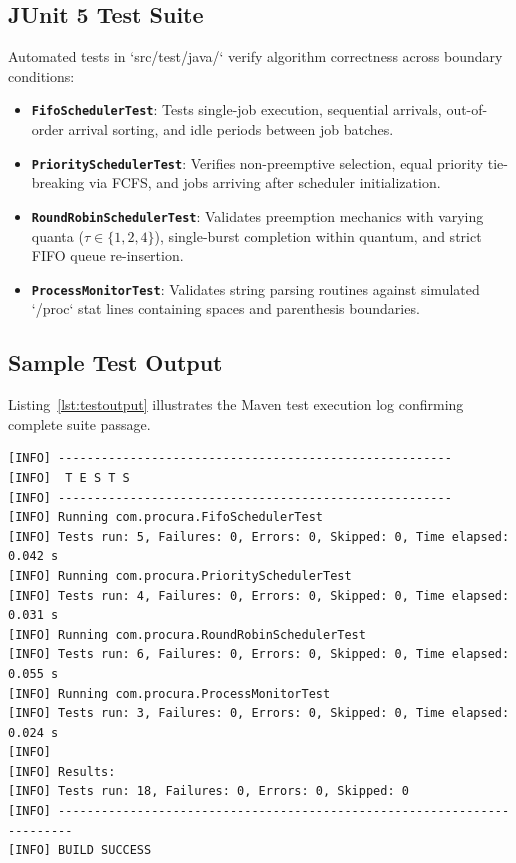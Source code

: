\documentclass[12pt,a4paper]{article}
\begin{document}
\subsection{JUnit 5 Test Suite}
Automated tests in `src/test/java/` verify algorithm correctness across boundary conditions:
\begin{itemize}
    \item \textbf{\texttt{FifoSchedulerTest}}: Tests single-job execution, sequential arrivals, out-of-order arrival sorting, and idle periods between job batches.
    \item \textbf{\texttt{PrioritySchedulerTest}}: Verifies non-preemptive selection, equal priority tie-breaking via FCFS, and jobs arriving after scheduler initialization.
    \item \textbf{\texttt{RoundRobinSchedulerTest}}: Validates preemption mechanics with varying quanta ($\tau \in \{1, 2, 4\}$), single-burst completion within quantum, and strict FIFO queue re-insertion.
    \item \textbf{\texttt{ProcessMonitorTest}}: Validates string parsing routines against simulated `/proc` stat lines containing spaces and parenthesis boundaries.
\end{itemize}

\subsection{Sample Test Output}
Listing~\ref{lst:testoutput} illustrates the Maven test execution log confirming complete suite passage.

\begin{lstlisting}[caption={Maven Surefire Unit Test Execution Summary}, label={lst:testoutput}]
[INFO] -------------------------------------------------------
[INFO]  T E S T S
[INFO] -------------------------------------------------------
[INFO] Running com.procura.FifoSchedulerTest
[INFO] Tests run: 5, Failures: 0, Errors: 0, Skipped: 0, Time elapsed: 0.042 s
[INFO] Running com.procura.PrioritySchedulerTest
[INFO] Tests run: 4, Failures: 0, Errors: 0, Skipped: 0, Time elapsed: 0.031 s
[INFO] Running com.procura.RoundRobinSchedulerTest
[INFO] Tests run: 6, Failures: 0, Errors: 0, Skipped: 0, Time elapsed: 0.055 s
[INFO] Running com.procura.ProcessMonitorTest
[INFO] Tests run: 3, Failures: 0, Errors: 0, Skipped: 0, Time elapsed: 0.024 s
[INFO] 
[INFO] Results:
[INFO] Tests run: 18, Failures: 0, Errors: 0, Skipped: 0
[INFO] ------------------------------------------------------------------------
[INFO] BUILD SUCCESS
\end{lstlisting}
\end{document}
